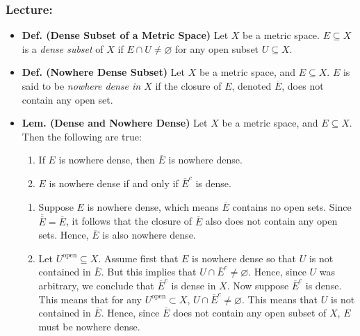 \documentclass{article}
\begin{document}
\subsubsection{Lecture:}
\begin{itemize}
	\item \textbf{Def. (Dense Subset of a Metric Space)} Let $X$ be a metric space. $E \subseteq X$ is a \textit{dense subset} of $X$ if $E \cap U \neq \varnothing$ for any open subset $U \subseteq X$. 
	
	\item \textbf{Def. (Nowhere Dense Subset)} Let $X$ be a metric space, and $E \subseteq X$. $E$ is said to be \textit{nowhere dense in $X$} if the closure of $E$, denoted $\overline{E}$, does not contain any open set. 
	
	\item \textbf{Lem. (Dense and Nowhere Dense)} Let $X$ be a metric space, and $E \subseteq X$. Then the following are true: \vspace{-0.25cm}
		\begin{enumerate}[itemsep =-2pt,label = (\arabic{*})]
			\item If $E$ is nowhere dense, then $\overline{E}$ is nowhere dense. 
			\item $E$ is nowhere dense if and only if $\overline{E}^{c}$ is dense. 
		\end{enumerate}
	
	\begin{solutions}
		\begin{enumerate}[itemsep =-2pt,label = (\arabic{*})]
			\item Suppose $E$ is nowhere dense, which means $\overline{E}$ contains no open sets. Since $\overline{\overline{E}} = \overline{E}$, it follows that the closure of $\overline{E}$ also does not contain any open sets. Hence, $\overline{E}$ is also nowhere dense. 
			\item Let $U^{\text{open}} \subseteq X$. Assume first that $E$ is nowhere dense so that $U$ is not contained in $\overline{E}$. But this implies that $U \cap\overline{E}^{c} \neq \varnothing$. Hence, since $U$ was arbitrary, we conclude that $\overline{E}^{c}$ is dense in $X$. Now suppose $\overline{E}^{c}$ is dense. This means that for any $U^{\text{open}} \subset X$, $U \cap \overline{E}^{c} \neq \varnothing$. This means that $U$ is not contained in $\overline{E}$. Hence, since $\overline{E}$ does not contain any open subset of $X$, $E$ must be nowhere dense. 
		\end{enumerate}
	\end{solutions}
	

\end{itemize}
\end{document}
